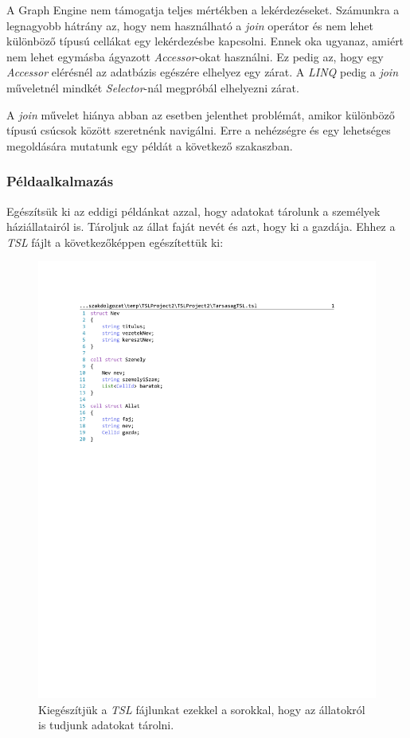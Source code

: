 A Graph Engine nem támogatja teljes mértékben a lekérdezéseket.\cite{GraphEngineLINQ} Számunkra a legnagyobb hátrány az, hogy nem használható a \emph{join} operátor és nem lehet különböző típusú cellákat egy lekérdezésbe kapcsolni. Ennek oka ugyanaz, amiért nem lehet egymásba ágyazott \emph{Accessor}-okat használni. Ez pedig az, hogy egy \emph{Accessor} elérésnél az adatbázis egészére elhelyez egy zárat. A \emph{LINQ} pedig a \emph{join} műveletnél mindkét \emph{Selector}-nál megpróbál elhelyezni zárat.

A \emph{join} művelet hiánya abban az esetben jelenthet problémát, amikor különböző típusú csúcsok között szeretnénk navigálni. Erre a nehézségre és egy lehetséges megoldására mutatunk egy példát a következő szakaszban.

\subsubsection{Példaalkalmazás}

Egészítsük ki az eddigi példánkat azzal, hogy adatokat tárolunk a személyek háziállatairól is. Tároljuk az állat faját nevét és azt, hogy ki a gazdája. Ehhez a \emph{TSL} fájlt a következőképpen egészítettük ki:

\begin{figure}[H]
	\centering
	\includegraphics[]{figures/TarsasagAllatTSL.pdf}
	\caption{Kiegészítjük a \emph{TSL} fájlunkat ezekkel a sorokkal, hogy az állatokról is tudjunk adatokat tárolni.}
	\label{fig:TarsasagAllat}
\end{figure}

